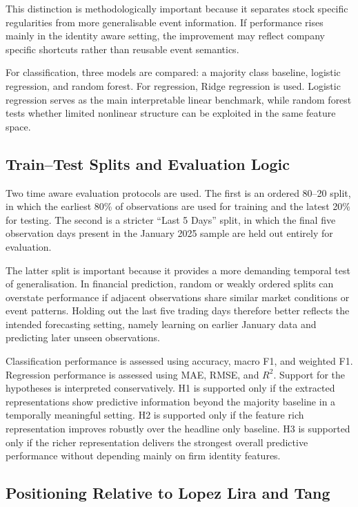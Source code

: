 This distinction is methodologically important because it separates stock specific regularities from more generalisable event information. If performance rises mainly in the identity aware setting, the improvement may reflect company specific shortcuts rather than reusable event semantics.

For classification, three models are compared: a majority class baseline, logistic regression, and random forest. For regression, Ridge regression is used. Logistic regression serves as the main interpretable linear benchmark, while random forest tests whether limited nonlinear structure can be exploited in the same feature space.

\subsection{Train--Test Splits and Evaluation Logic}

Two time aware evaluation protocols are used. The first is an ordered 80--20 split, in which the earliest 80\% of observations are used for training and the latest 20\% for testing. The second is a stricter \enquote{Last 5 Days} split, in which the final five observation days present in the January 2025 sample are held out entirely for evaluation.

The latter split is important because it provides a more demanding temporal test of generalisation. In financial prediction, random or weakly ordered splits can overstate performance if adjacent observations share similar market conditions or event patterns. Holding out the last five trading days therefore better reflects the intended forecasting setting, namely learning on earlier January data and predicting later unseen observations.

Classification performance is assessed using accuracy, macro F1, and weighted F1. Regression performance is assessed using MAE, RMSE, and $R^2$. Support for the hypotheses is interpreted conservatively. H1 is supported only if the extracted representations show predictive information beyond the majority baseline in a temporally meaningful setting. H2 is supported only if the feature rich representation improves robustly over the headline only baseline. H3 is supported only if the richer representation delivers the strongest overall predictive performance without depending mainly on firm identity features.

\subsection{Positioning Relative to Lopez Lira and Tang}

